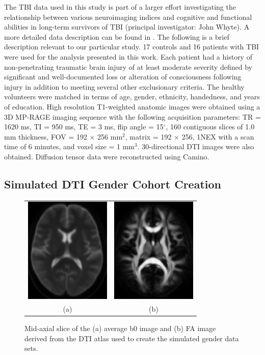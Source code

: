 \documentclass[final,5p,times,twocolumn]{elsarticle}
\begin{document}
The TBI data used in this study is part of a larger effort investigating the relationship between various neuroimaging indices and cognitive and functional abilities in long-term survivors of TBI (principal investigator: John Whyte). A more detailed data description can be found in \cite{Avants2008}. The following is a brief description relevant to our particular study.  
17 controls and 16 patients with TBI were used for the analysis presented in this work.  Each patient had a history of non-penetrating traumatic brain injury 
of at least moderate severity defined by significant and well-documented
loss or alteration of consciousness following injury in addition to meeting
several other exclusionary criteria.  The healthy volunteers were matched in terms of age, gender, ethnicity, handedness, and years of education.
High resolution T1-weighted anatomic images were obtained using a 3D MP-RAGE 
imaging sequence with the following acquisition parameters: TR = 1620 ms, 
TI = 950 ms, TE = 3 ms, flip angle = 15$^\circ$, 160 contiguous slices of 
1.0 mm thickness, FOV = 192 $\times$ 256 mm$^2$, matrix = 192 $\times$ 256, 
1NEX with a scan time of 6 minutes, and voxel size = 1 mm$^3$.  30-directional
DTI images were also obtained. Diffusion tensor data were reconstructed using Camino.

\subsection{Simulated DTI Gender Cohort Creation}
\label{sec:sim}

\begin{figure}
\begin{center}
\begin{tabular}{cc}
  \includegraphics[width=41mm]{B0Average_slice85.png} & 
  \includegraphics[width=41mm]{DTIAverageFA_slice85.png} \\
  (a) & (b) 
\end{tabular}
\caption{Mid-axial slice of the (a) average b0 image and (b) FA image derived from the DTI atlas used
to create the simulated gender data sets.}
\label{fig:simulated}
\end{center}        
\end{figure}
\end{document}
